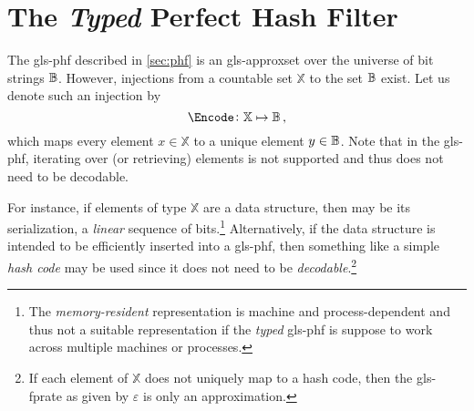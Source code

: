 \documentclass[ ../main.tex]{subfiles}
\begin{document}
\section{The \emph{Typed} Perfect Hash Filter}
The \gls{gls-phf} described in \cref{sec:phf} is an \gls{gls-approxset} over the universe of bit strings $\mathbb{B}$. However, injections from a countable set $\mathbb{X}$ to the set $\mathbb{B}$ exist. Let us denote such an injection by
\begin{equation}
    \Encode \colon \mathbb{X} \mapsto \cisb\,,
\end{equation}
which maps every element $x \in \mathbb{X}$ to a unique element $y \in \mathbb{B}$. Note that in the \gls{gls-phf}, iterating over (or retrieving) elements is not supported and thus \Encode does not need to be decodable.

For instance, if elements of type $\mathbb{X}$ are a data structure, then \Encode may be its serialization, a \emph{linear} sequence of bits.\footnote{The \emph{memory-resident} representation is machine and process-dependent and thus not a suitable representation if the \emph{typed} \gls{gls-phf} is suppose to work across multiple machines or processes.} Alternatively, if the data structure is intended to be efficiently inserted into a \gls{gls-phf}, then something like a simple \emph{hash code} may be used since it does not need to be \emph{decodable}.\footnote{If each element of $\mathbb{X}$ does not uniquely map to a hash code, then the \gls{gls-fprate} as given by $\varepsilon$ is only an approximation.}
\end{document}
